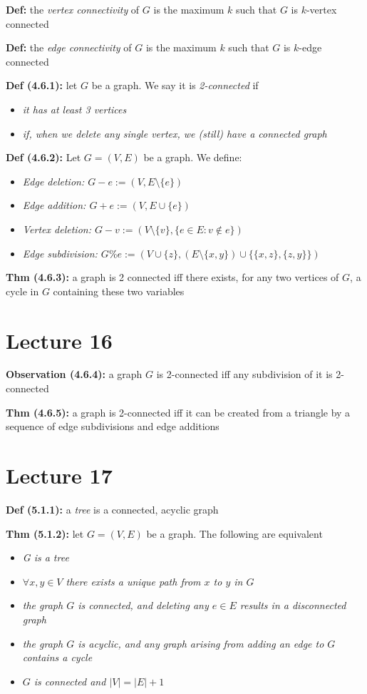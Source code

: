 \documentclass[12pt]{article}
\begin{document}
\textbf{Def: }the \emph{vertex connectivity} of $G$ is the maximum $k$ such that $G$ is $k$-vertex connected

\textbf{Def: }the \emph{edge connectivity} of $G$ is the maximum $k$ such that $G$ is $k$-edge connected

\textbf{Def (4.6.1): }let $G$ be a graph. We say it is \emph{2-connected} if
\begin{itemize}
    \item \emph{it has at least 3 vertices}
    \item \emph{if, when we delete any single vertex, we (still) have a connected graph}
\end{itemize}

\textbf{Def (4.6.2): }Let $G = (V, E)$ be a graph. We define:
\begin{itemize}
    \item \emph{Edge deletion: $G - e := (V, E \setminus \{ e \})$} 
    \item \emph{Edge addition: $G + e := (V, E \cup \{ e\})$}
    \item \emph{Vertex deletion: $G - v := (V \setminus \{ v \}, \{ e \in E : v \notin e \})$}
    \item \emph{Edge subdivision: $G \% e := (V \cup \{ z \}, (E \setminus \{ x, y \}) \cup \{ \{ x, z \}, \{ z, y\} \})$}
\end{itemize}

\textbf{Thm (4.6.3): }a graph is 2 connected iff there exists, for any two vertices of $G$, a cycle in $G$ containing these two variables

\clearpage

\section{Lecture 16}
\textbf{Observation (4.6.4): }a graph $G$ is 2-connected iff any subdivision of it is 2-connected

\textbf{Thm (4.6.5): }a graph is 2-connected iff it can be created from a triangle by a sequence of edge subdivisions and edge additions

\clearpage

\section{Lecture 17}
\textbf{Def (5.1.1): }a \emph{tree} is a connected, acyclic graph

\textbf{Thm (5.1.2): }let $G = (V, E)$ be a graph. The following are equivalent
\begin{itemize}
    \item \emph{G is a tree}
    \item \emph{$\forall x, y \in V$ there exists a unique path from $x$ to $y$ in $G$}
    \item \emph{the graph $G$ is connected, and deleting any $e \in E$ results in a disconnected graph}
    \item \emph{the graph $G$ is acyclic, and any graph arising from adding an edge to $G$ contains a cycle}
    \item \emph{$G$ is connected and $|V| = |E| + 1$}
\end{itemize}
\end{document}
